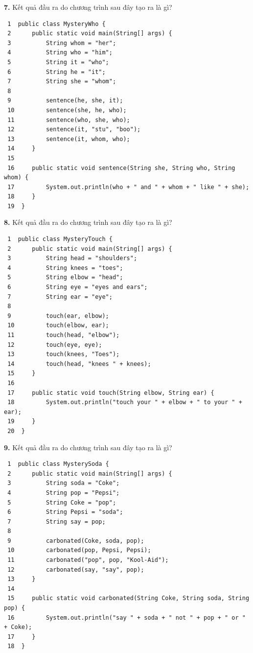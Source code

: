 \textbf{7.} Kết quả đầu ra do chương trình sau đây tạo ra là gì?

\begin{verbatim}
 1  public class MysteryWho {
 2      public static void main(String[] args) {
 3          String whom = "her";
 4          String who = "him";
 5          String it = "who";
 6          String he = "it";
 7          String she = "whom";
 8
 9          sentence(he, she, it);
 10         sentence(she, he, who);
 11         sentence(who, she, who);
 12         sentence(it, "stu", "boo");
 13         sentence(it, whom, who);
 14     }
 15
 16     public static void sentence(String she, String who, String whom) {
 17         System.out.println(who + " and " + whom + " like " + she);
 18     }
 19  }
\end{verbatim}

\textbf{8.} Kết quả đầu ra do chương trình sau đây tạo ra là gì?

\begin{verbatim}
 1  public class MysteryTouch {
 2      public static void main(String[] args) {
 3          String head = "shoulders";
 4          String knees = "toes";
 5          String elbow = "head";
 6          String eye = "eyes and ears";
 7          String ear = "eye";
 8
 9          touch(ear, elbow);
 10         touch(elbow, ear);
 11         touch(head, "elbow");
 12         touch(eye, eye);
 13         touch(knees, "Toes");
 14         touch(head, "knees " + knees);
 15     }
 16
 17     public static void touch(String elbow, String ear) {
 18         System.out.println("touch your " + elbow + " to your " + ear);
 19     }
 20  }
\end{verbatim}

\textbf{9.} Kết quả đầu ra do chương trình sau đây tạo ra là gì?

\begin{verbatim}
 1  public class MysterySoda {
 2      public static void main(String[] args) {
 3          String soda = "Coke";
 4          String pop = "Pepsi";
 5          String Coke = "pop";
 6          String Pepsi = "soda";
 7          String say = pop;
 8
 9          carbonated(Coke, soda, pop);
 10         carbonated(pop, Pepsi, Pepsi);
 11         carbonated("pop", pop, "Kool-Aid");
 12         carbonated(say, "say", pop);
 13     }
 14
 15     public static void carbonated(String Coke, String soda, String pop) {
 16         System.out.println("say " + soda + " not " + pop + " or " + Coke);
 17     }
 18  }
\end{verbatim}

